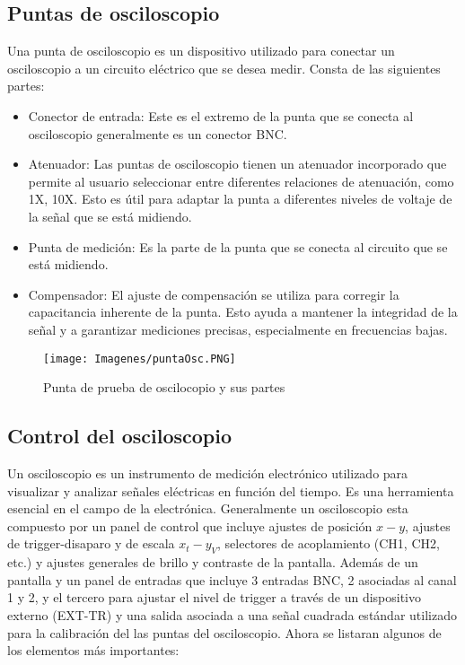 \subsection{Puntas de osciloscopio}
Una punta de osciloscopio es un dispositivo utilizado para conectar un osciloscopio a un circuito eléctrico que se desea medir. Consta de las siguientes partes:
\begin{itemize}
    \item Conector de entrada: Este es el extremo de la punta que se conecta al osciloscopio generalmente es un conector BNC.
    \item Atenuador: Las puntas de osciloscopio tienen un atenuador incorporado que permite al usuario seleccionar entre diferentes relaciones de atenuación, como 1X, 10X. Esto es útil para adaptar la punta a diferentes niveles de voltaje de la señal que se está midiendo.
    \item Punta de medición: Es la parte de la punta que se conecta al circuito que se está midiendo.
    \item Compensador: El ajuste de compensación se utiliza para corregir la capacitancia inherente de la punta. Esto ayuda a mantener la integridad de la señal y a garantizar mediciones precisas, especialmente en frecuencias bajas.
\end{itemize}

\begin{figure}[H]
    \centering
        \texttt{[image: Imagenes/puntaOsc.PNG]}
    \caption{Punta de prueba de oscilocopio y sus partes}
\label{fig:puntaOsc}
\end{figure}

\vspace{0.5cm}
\subsection{Control del osciloscopio}

Un osciloscopio es un instrumento de medición electrónico utilizado para visualizar y analizar señales eléctricas en función del tiempo. Es una herramienta esencial en el campo de la electrónica. Generalmente un osciloscopio esta compuesto por un panel de control que incluye ajustes de posición $x-y$, ajustes de trigger-disaparo y de escala $x_t-y_V$, selectores de acoplamiento (CH1, CH2, etc.) y ajustes generales de brillo y contraste de la pantalla. Además de un pantalla y un panel de entradas que incluye 3 entradas BNC, 2 asociadas al canal 1 y 2, y el tercero para ajustar el nivel de trigger a través de un dispositivo externo (EXT-TR) y una salida asociada a una señal cuadrada estándar utilizado para la calibración del las puntas del osciloscopio.
Ahora se listaran algunos de los elementos más importantes:
    
